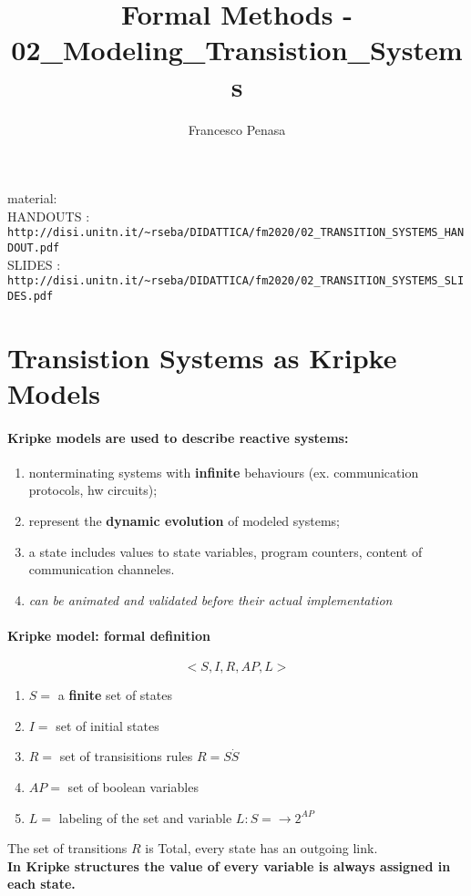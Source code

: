 \documentclass[11pt]{article}
\begin{document}
\author{Francesco Penasa}
\title{Formal Methods - 02\_Modeling\_Transistion\_Systems}
\maketitle

\medskip

material: 
\\
HANDOUTS : \texttt{http://disi.unitn.it/\~{}rseba/DIDATTICA/fm2020/02\_TRANSITION\_SYSTEMS\_HANDOUT.pdf}
\\
SLIDES : \texttt{http://disi.unitn.it/\~{}rseba/DIDATTICA/fm2020/02\_TRANSITION\_SYSTEMS\_SLIDES.pdf} 
\\

\section{Transistion Systems as Kripke Models} %
\label{sec:transistion_systems_as_kripke_models}
\paragraph{Kripke models are used to describe reactive systems:} %
\label{par:kripke_models_are_used_to_describe_reactive_systems_}
\begin{enumerate}
	\item nonterminating systems with \textbf{infinite} behaviours (ex. communication protocols, hw circuits);
	\item represent the \textbf{dynamic evolution} of modeled systems;
	\item a state includes values to state variables, program counters, content of communication channeles.
	\item \textit{can be animated and validated before their actual implementation}
\end{enumerate}

\paragraph{Kripke model: formal definition} %
\label{par:kripke_model_formal_definition}
\[
	<S,I,R,AP,L>	
\]
\begin{enumerate}
	\item $S =$ a \textbf{finite} set of states
	\item $I =$ set of initial states 
	\item $R =$ set of transisitions rules $R = S \dot S$
	\item $AP =$ set of boolean variables 
	\item $L =$ labeling of the set and variable $L : S = \rightarrow 2^{AP}$ \\
\end{enumerate}
The set of transitions $R$ is Total, every state has an outgoing link.\\
\textbf{In Kripke structures the value of every variable is always assigned in each state.}
\end{document}
